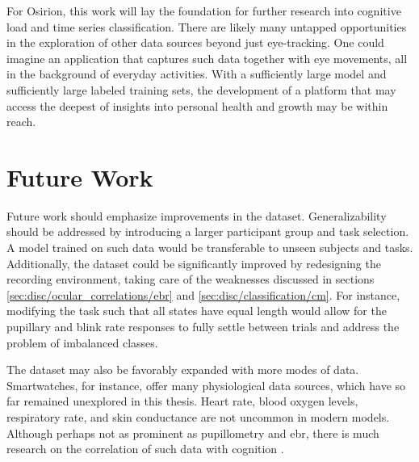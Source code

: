 For Osirion, this work will lay the foundation for further research into cognitive load and time series classification. There are likely many untapped opportunities in the exploration of other data sources beyond just eye-tracking. One could imagine an application that captures such data together with eye movements, all in the background of everyday activities. With a sufficiently large model and sufficiently large labeled training sets, the development of a platform that may access the deepest of insights into personal health and growth may be within reach. 



\section{Future Work}

Future work should emphasize improvements in the dataset. Generalizability should be addressed by introducing a larger participant group and task selection. 
A model trained on such data would be transferable to unseen subjects and tasks. Additionally, the dataset could be significantly improved by redesigning the recording environment, taking care of the weaknesses discussed in sections \ref{sec:disc/ocular_correlations/ebr} and \ref{sec:disc/classification/cm}. For instance, modifying the task such that all states have equal length would allow for the pupillary and blink rate responses to fully settle between trials and address the problem of imbalanced classes.

The dataset may also be favorably expanded with more modes of data. Smartwatches, for instance, offer many physiological data sources, which have so far remained unexplored in this thesis. Heart rate, blood oxygen levels, respiratory rate, and skin conductance are not uncommon in modern models. Although perhaps not as prominent as pupillometry and \acrshort{ebr}, there is much research on the correlation of such data with cognition 
\cite{paas1994A, solhjoo2019, setz2010, ikehara2005, choi2014}.








